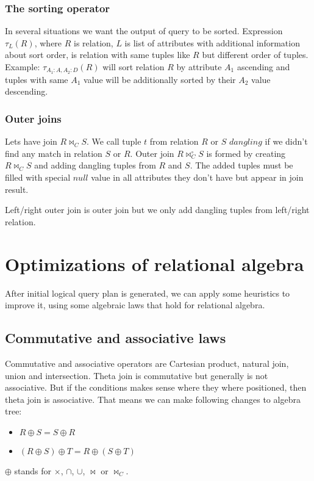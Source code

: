 \subsubsection{The sorting operator}

In several situations we want the output of query to be sorted. Expression $\tau_L(R)$, where $R$ is relation, $L$ is list of attributes with additional information about sort order, is relation with same tuples like $R$ but different order of tuples. Example:  $\tau_{A_1:A,A_2:D}(R)$ will sort relation $R$ by attribute $A_1$ ascending and tuples with same $A_1$ value will be additionally sorted by their $A_2$ value descending. 

\subsubsection{Outer joins}
Lets have join $R\Join_C S$. We call tuple $t$ from relation $R$ or $S$ $dangling$ if
we didn't find any match in relation $S$ or $R$. Outer join $R\Join^\circ_C S$ is formed by creating $R\Join_C S$ and adding dangling tuples from $R$ and $S$. The added tuples must be filled with special $null$ value in all attributes they don't have but appear in join result.

Left/right outer join is outer join but we only add dangling tuples from left/right relation.

\section{Optimizations of relational algebra}

After initial logical query plan is generated, we can apply some heuristics to improve it, using some algebraic laws that hold for relational algebra. 


\subsection{Commutative and associative laws}
Commutative and associative operators are Cartesian product, natural join, union and intersection. Theta join is commutative but generally is not associative. But if the conditions makes sense where they where positioned, then theta join is associative.
That means we can make following changes to algebra tree:

\begin{itemize}
\item $R \oplus S = S \oplus R$

\item $(R \oplus S) \oplus T = R \oplus (S \oplus T)$
\end{itemize}
$\oplus$ stands for $\times$, $\cap$, $\cup$, $\Join$ or $\Join_C$.

